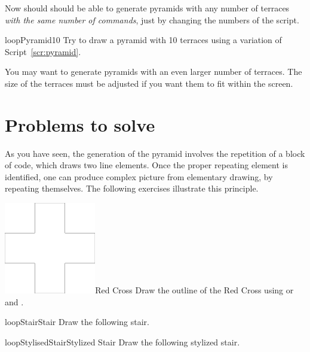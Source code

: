 Now should should be able to generate pyramids with any number of
terraces \emph{with the same number of commands}, just by changing
the numbers of the script.

\begin{exofig}{loopPyramid10} \label{exo:pyramid}
Try to draw a pyramid with 10 terraces using a variation of Script~\ref{scr:pyramid}.
\end{exofig}

You may want to generate pyramids with an even larger number of
terraces. The size of the terraces must be adjusted if you want
them to fit within the screen.

\section{Problems to solve}
As you have seen, the generation of the pyramid involves the
repetition of a block of code, which draws two line elements. Once the
proper repeating element is identified, one can produce complex
picture from elementary drawing, by repeating themselves.  The
following exercises illustrate this principle.

\begin{exofigwithsizeandtitle}{\includegraphics[width=4cm]{loopCross}}{Red Cross} \label{exo:redcross}
Draw the outline of the Red Cross using \turnLeft or \turnRight and
\timesRepeat.
\end{exofigwithsizeandtitle}


\begin{exofigwithtitle}{loopStair}{Stair}\label{exo:stair}
Draw the following stair.
\end{exofigwithtitle}



\begin{exofigwithtitle}{loopStylisedStair}{Stylized Stair}\label{exo:stylizedstair}
Draw the following stylized stair.
\end{exofigwithtitle}

